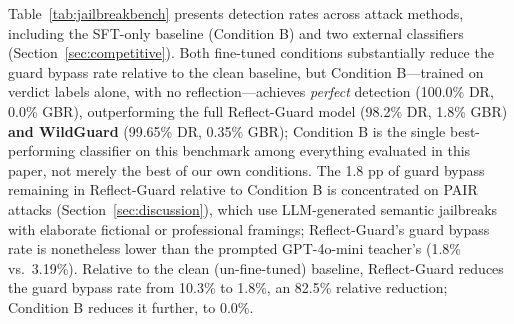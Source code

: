 \documentclass[superintelligence,article,accept,moreauthors]{Definitions/mdpi}
\begin{document}
Table~\ref{tab:jailbreakbench} presents detection rates across attack methods, including the SFT-only baseline (Condition B) and two external classifiers (Section~\ref{sec:competitive}). Both fine-tuned conditions substantially reduce the guard bypass rate relative to the clean baseline, but Condition B---trained on verdict labels alone, with no reflection---achieves \emph{perfect} detection (100.0\% DR, 0.0\% GBR), outperforming the full Reflect-Guard model (98.2\% DR, 1.8\% GBR) \textbf{and WildGuard} (99.65\% DR, 0.35\% GBR); Condition B is the single best-performing classifier on this benchmark among everything evaluated in this paper, not merely the best of our own conditions. The 1.8 pp of guard bypass remaining in Reflect-Guard relative to Condition B is concentrated on PAIR attacks (Section~\ref{sec:discussion}), which use LLM-generated semantic jailbreaks with elaborate fictional or professional framings; Reflect-Guard's guard bypass rate is nonetheless lower than the prompted GPT-4o-mini teacher's (1.8\% vs.\ 3.19\%). Relative to the clean (un-fine-tuned) baseline, Reflect-Guard reduces the guard bypass rate from 10.3\% to 1.8\%, an 82.5\% relative reduction; Condition B reduces it further, to 0.0\%.
\end{document}

